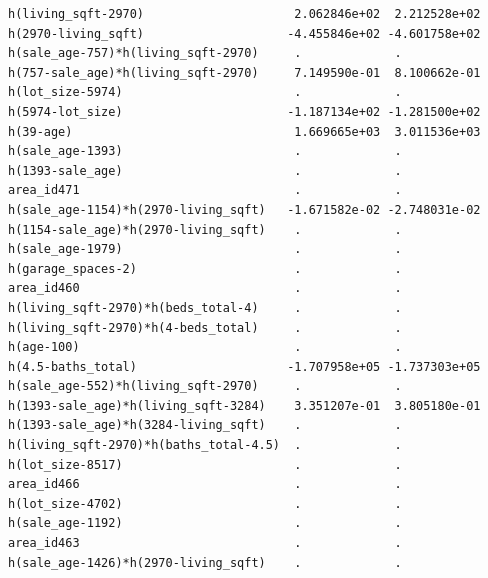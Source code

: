 \documentclass[
]{article}
\begin{document}
\begin{verbatim}
h(living_sqft-2970)                     2.062846e+02  2.212528e+02
h(2970-living_sqft)                    -4.455846e+02 -4.601758e+02
h(sale_age-757)*h(living_sqft-2970)     .             .           
h(757-sale_age)*h(living_sqft-2970)     7.149590e-01  8.100662e-01
h(lot_size-5974)                        .             .           
h(5974-lot_size)                       -1.187134e+02 -1.281500e+02
h(39-age)                               1.669665e+03  3.011536e+03
h(sale_age-1393)                        .             .           
h(1393-sale_age)                        .             .           
area_id471                              .             .           
h(sale_age-1154)*h(2970-living_sqft)   -1.671582e-02 -2.748031e-02
h(1154-sale_age)*h(2970-living_sqft)    .             .           
h(sale_age-1979)                        .             .           
h(garage_spaces-2)                      .             .           
area_id460                              .             .           
h(living_sqft-2970)*h(beds_total-4)     .             .           
h(living_sqft-2970)*h(4-beds_total)     .             .           
h(age-100)                              .             .           
h(4.5-baths_total)                     -1.707958e+05 -1.737303e+05
h(sale_age-552)*h(living_sqft-2970)     .             .           
h(1393-sale_age)*h(living_sqft-3284)    3.351207e-01  3.805180e-01
h(1393-sale_age)*h(3284-living_sqft)    .             .           
h(living_sqft-2970)*h(baths_total-4.5)  .             .           
h(lot_size-8517)                        .             .           
area_id466                              .             .           
h(lot_size-4702)                        .             .           
h(sale_age-1192)                        .             .           
area_id463                              .             .           
h(sale_age-1426)*h(2970-living_sqft)    .             .           
                                                                  

\end{verbatim}
\end{document}
